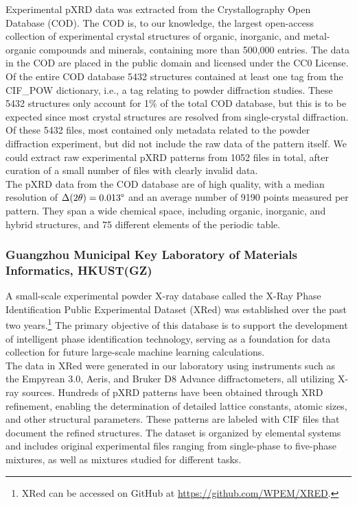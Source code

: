 Experimental pXRD data was extracted from the Crystallography Open Database (COD)\cite{Grazulis2009, Vaitkus2023}. The COD is, to our knowledge, the largest open-access collection of experimental crystal structures of organic, inorganic, and metal-organic compounds and minerals, containing more than 500,000 entries. The data in the COD are placed in the public domain and licensed under the CC0 License. Of the entire COD database 5432 structures contained at least one tag from the {CIF\_POW} dictionary, i.e., a tag relating to powder diffraction studies. These 5432 structures only account for 1\% of the total COD database, but this is to be expected since most crystal structures are resolved from single-crystal diffraction. Of these 5432 files, most contained only metadata related to the powder diffraction experiment, but did not include the raw data of the pattern itself. We could extract raw experimental pXRD patterns from 1052 files in total, after curation of a small number of files with clearly invalid data. \\

The pXRD data from the COD database are of high quality, with a median resolution of $\Delta(2\theta) = 0.013\degree$ and an average number of 9190 points measured per pattern. They span a wide chemical space, including organic, inorganic, and hybrid structures, and 75 different elements of the periodic table.

\subsubsection*{Guangzhou Municipal Key Laboratory of Materials Informatics, HKUST(GZ)}

A small-scale experimental powder X-ray database called the X-Ray Phase Identification Public Experimental Dataset (XRed) was established over the past two years.\footnote{XRed can be accessed on GitHub at \url{https://github.com/WPEM/XRED}.} The primary objective of this database is to support the development of intelligent phase identification technology, serving as a foundation for data collection for future large-scale machine learning calculations. \\

The data in XRed were generated in our laboratory using instruments such as the Empyrean 3.0, Aeris, and Bruker D8 Advance diffractometers, all utilizing  X-ray sources. Hundreds of pXRD patterns have been obtained through XRD refinement, enabling the determination of detailed lattice constants, atomic sizes, and other structural parameters. These patterns are labeled with CIF files that document the refined structures. The dataset is organized by elemental systems and includes original experimental files ranging from single-phase to five-phase mixtures, as well as mixtures studied for different tasks. \\

